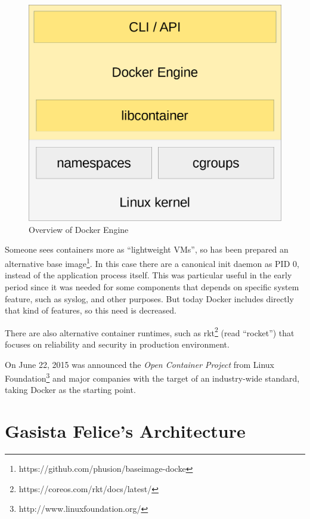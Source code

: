 \begin{figure}[htbp]
\centering
\includegraphics{media/ch3-docker.png}
\caption{Overview of Docker Engine}
\end{figure}

Someone sees containers more as ``lightweight VMs'', so has been
prepared an alternative base image\footnote{https://github.com/phusion/baseimage-docke}. In this case there are a
canonical init daemon as PID 0, instead of the application process
itself. This was particular useful in the early period since it was
needed for some components that depends on specific system feature, such
as syslog, and other purposes. But today Docker includes directly that
kind of features, so this need is decreased.

There are also alternative container runtimes, such as rkt\footnote{https://coreos.com/rkt/docs/latest/} (read ``rocket'') that focuses on reliability and security in production environment.

On June 22, 2015 was announced the \textit{Open Container
Project}\cite{OpenContainerProject} from Linux Foundation\footnote{http://www.linuxfoundation.org/} and
major companies with the target of an industry-wide standard, taking
Docker as the starting point.

\section{Gasista Felice's
Architecture}\label{gasista-felices-architecture}

